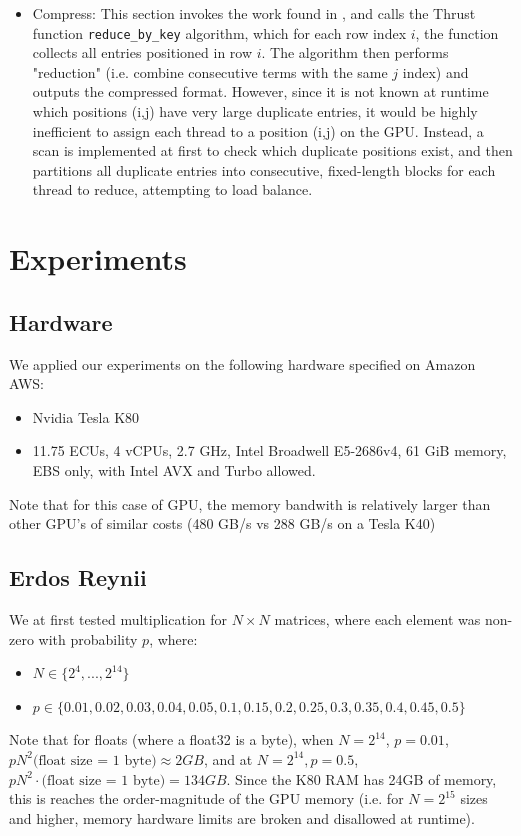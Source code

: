 \documentclass[12pt]{article}
\def\code#1{\texttt{#1}}
\begin{document}
\begin{itemize}
\item Compress: This section invokes the work found in \cite{multigrid}, and calls the Thrust function \code{reduce\_by\_key} algorithm, which for each row index $i$, the function collects all entries positioned in row $i$. The algorithm then performs "reduction" (i.e. combine consecutive terms with the same $j$ index) and outputs the compressed format. However, since it is not known at runtime which positions (i,j) have very large duplicate entries, it would be highly inefficient to assign each thread to a position (i,j) on the GPU. Instead, a scan is implemented at first to check which duplicate positions exist, and then partitions all duplicate entries into consecutive, fixed-length blocks for each thread to reduce, attempting to load balance. 
\end{itemize}



\section{Experiments}
\subsection{Hardware}
We applied our experiments on the following hardware specified on Amazon AWS:
\begin{itemize}
\item Nvidia Tesla K80 
\item 11.75 ECUs, 4 vCPUs, 2.7 GHz, Intel Broadwell E5-2686v4, 61 GiB memory, EBS only, with Intel AVX and Turbo allowed. 
\end{itemize}
Note that for this case of GPU, the memory bandwith is relatively larger than other GPU's of similar costs (480 GB/s vs 288 GB/s on a Tesla K40) 

\subsection{Erdos Reynii}
We at first tested multiplication for $N \times N$ matrices, where each element was non-zero with probability $p$, where: 
\begin{itemize} \item $N \in \{2^{4},...,2^{14} \}$ \item $p \in \{0.01, 0.02, 0.03, 0.04, 0.05, 0.1, 0.15, 0.2, 0.25, 0.3, 0.35, 0.4, 0.45, 0.5\}$
\end{itemize}
Note that for floats (where a float32 is a byte), when $N = 2^{14}$, $p = 0.01$, $pN^{2} \text{(float size = 1 byte)} \approx 2 GB$, and at $N = 2^{14}, p = 0.5$, $pN^{2} \cdot \text{(float size = 1 byte)} = 134 GB$. Since the K80 RAM has 24GB of memory, this is reaches the order-magnitude of the GPU memory (i.e. for $N = 2^{15}$ sizes and higher, memory hardware limits are broken and disallowed at runtime). 
\end{document}
